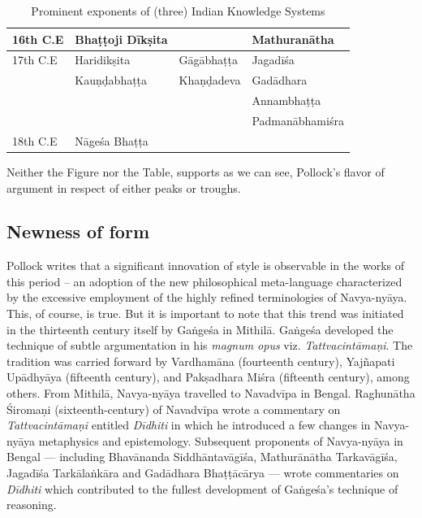 \begin{table}[H]
\begin{tabular}{|l|l|l|l|}
16th C.E & Bhaṭṭoji Dīkṣita\index{Bhattoji Diksita@Bhaṭṭoji Dīkṣita} & & Mathuranātha\\\hline
17th C.E & Haridikṣita & Gāgābhaṭṭa\index{Gagabhatta@Gāgābhaṭṭa} & Jagadīśa\\\hline
& Kauṇḍabhaṭṭa\index{Kaundabhatta@Kauṇḍabhaṭṭa} & Khaṇḍadeva & Gadādhara\index{Gadadhara@Gadādhara}\\\hline
& & & Annambhaṭṭa\index{Annambhatta@Annambhaṭṭa}\\\hline
& & & Padmanābhamiśra\\\hline
18th C.E  & Nāgeśa Bhaṭṭa\index{Nagesabhatta@Nāgeśabhaṭṭa} & & \\\hline
\end{tabular}
\caption{Prominent exponents of (three) Indian Knowledge Systems}\label{chap2-tab1}
\end{table}

\newpage

Neither the Figure nor the Table, supports as we can see, Pollock’s flavor of argument in respect of either peaks or troughs.

\subsection{Newness of form}%

Pollock writes that a significant innovation of style is observable in the works of this period – an adoption of the new philosophical meta-language characterized by the excessive employment of the highly refined terminologies of Navya-nyāya. This, of course, is true. But it is important to note that this trend was initiated in the thirteenth century itself by Gaṅgeśa in Mithilā. Gaṅgeśa developed the technique of subtle argumentation in his {\sl magnum opus}  viz. {\sl Tattvacintāmaṇi}. The tradition was carried forward by Vardhamāna (fourteenth century), Yajñapati Upādhyāya (fifteenth century), and Pakṣadhara Miśra (fifteenth century), among others. From Mithilā, Navya-nyāya travelled to Navadvīpa in Bengal. Raghunātha Śiromaṇi (sixteenth-century) of Navadvīpa wrote a commentary on {\sl Tattvacintāmaṇi} entitled {\sl Dīdhiti} in which he introduced a few changes in Navya-nyāya metaphysics and epistemology. Subsequent proponents of Navya-nyāya in Bengal — including Bhavānanda Siddhāntavāgīśa, Mathurānātha Tarkavāgīśa, Jagadīśa Tarkālaṅkāra and Gadādhara Bhaṭṭācārya — wrote commentaries on {\sl Dīdhiti} which contributed to the fullest development of Gaṅgeśa’s technique of reasoning. 

